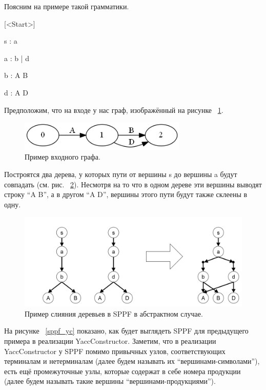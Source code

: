 Поясним на примере такой грамматики.

[<Start>] 

s : a 

a : b | d 

b : A B

d : A D 

Предположим, что на входе у нас граф, изображённый на рисунке ~\ref{sppf_input}.

\begin{figure}[h]
\centering
\includegraphics[width=80mm]{Pictures/SPPF_input.png}
\caption{Пример входного графа.}
\label{sppf_input}
\end{figure}

Построятся два дерева, у которых пути от вершины s до вершины a будут совпадать (см. рис. ~\ref{sppf2}). Несмотря на то что в одном дереве эти вершины выводят строку “A B”, а в другом “A D”, вершины этого пути будут также склеены в одну. 

\begin{figure}[h]
\centering
\includegraphics[width=150mm]{Pictures/sppf2.png}
\caption{Пример слияния деревьев в SPPF в абстрактном случае.}
\label{sppf2}
\end{figure}

На рисунке ~\ref{sppf_yc} показано, как будет выглядеть SPPF для предыдущего примера в реализации YaccConstructor. Заметим, что в реализации YaccConstructor у SPPF помимо привычных узлов, соответствующих терминалам и нетерминалам (далее будем называть их “вершинами-символами”), есть ещё промежуточные узлы, которые содержат в себе номера продукции (далее будем называть такие вершины “вершинами-продукциями”). 


